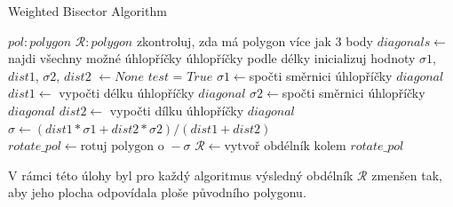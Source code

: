 \begin{algorithm}[h]
\caption{Weighted Bisector Algorithm}\label{alg:cap}
\begin{algorithmic}
\Require $pol: polygon$
\Ensure $\mathcal{R}: polygon$
\State
\State zkontroluj, zda má polygon více jak 3 body 
\State $diagonals \gets $najdi všechny možné úhlopříčky
 úhlopříčky podle délky 
\State inicializuj hodnoty $\sigma1$, $dist1$, $\sigma2$, $dist2$ $\gets None$
\State
{}
        \Else {}
        \State $test$ = $True$
        \EndIf 
    \EndFor 
    \State
     
    \Else
         
        \State $\sigma1 \gets $spočti směrnici úhlopříčky $diagonal$
        \State $dist1 \gets $ vypočti délku úhlopříčky $diagonal$
        \Else {}
        \State $\sigma2 \gets $spočti směrnici úhlopříčky $diagonal$
        \State $dist2 \gets $ vypočti dílku úhlopříčky $diagonal$
        \EndIf
    \EndIf
\EndFor
\State
\State $\sigma \gets (dist1 * \sigma1 + dist2 * \sigma2) / (dist1 + dist2)$ 
\State $rotate\_pol \gets {\text{rotuj polygon o }}- \sigma$ 
\State $\mathcal{R} \gets {\text{vytvoř obdélník kolem }} rotate\_pol$ 
\State
{}

\end{algorithmic}
\end{algorithm}

\par V rámci této úlohy byl pro každý algoritmus výsledný obdélník $\mathcal{R}$ zmenšen tak, aby jeho plocha odpovídala ploše původního polygonu.